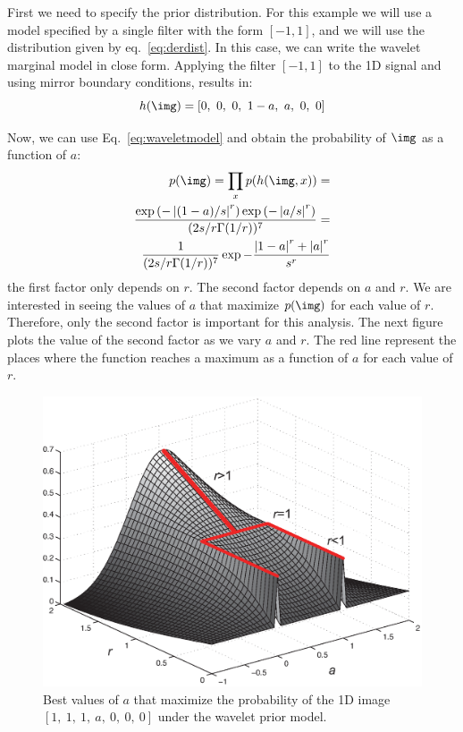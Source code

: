 First we need to specify the prior distribution. For this example we will use a model specified by a single filter with the form $[-1, 1]$, and we will use the distribution given by eq.~\ref{eq:derdist}. In this case, we can write the wavelet marginal model in close form. Applying the filter $\left[-1, 1\right]$ to the 1D signal and using mirror boundary conditions, results in:
\begin{equation}
  h(\img) = \left[0,~0,~ 0,~ 1-a,~ a,~ 0,~ 0\right]
\end{equation}

Now, we can use Eq.~\ref{eq:waveletmodel} and obtain the probability of $\img$ as a function of $a$:
\begin{eqnarray}
  p(\img) = \prod_{x} p(h(\img, x)) = \\
  \frac {\exp \left(- \left| (1-a)/s  \right|^r \right) \exp \left(- \left| a/s  \right|^r \right)}{(2s/r \Gamma(1/r))^7} = \\
  \frac{1}{(2s/r \Gamma(1/r))^7} \exp - \frac{\left| 1-a \right|^r+\left| a \right|^r} {s^r}
\end{eqnarray}
the first factor only depends on $r$. The second factor depends on $a$ and $r$. We are interested in seeing the values of $a$ that maximize $p(\img)$ for each value of $r$. Therefore, only the second factor is important for this analysis. The next figure plots the value of the second factor as we vary $a$ and $r$. The red line represent the places where the function reaches a maximum as a function of $a$ for each value of $r$.

\begin{figure}[htpb]
  \centerline{
    \includegraphics[width=.6\linewidth]{figures/statistical_image_models/best_a_s1.eps}
  }
  \caption{Best values of $a$ that maximize the probability of the 1D image $\left[1,~ 1,~ 1,~ a,~ 0,~ 0,~ 0\right]$ under the wavelet prior model.}
  \label{fig:best_a}
\end{figure}


